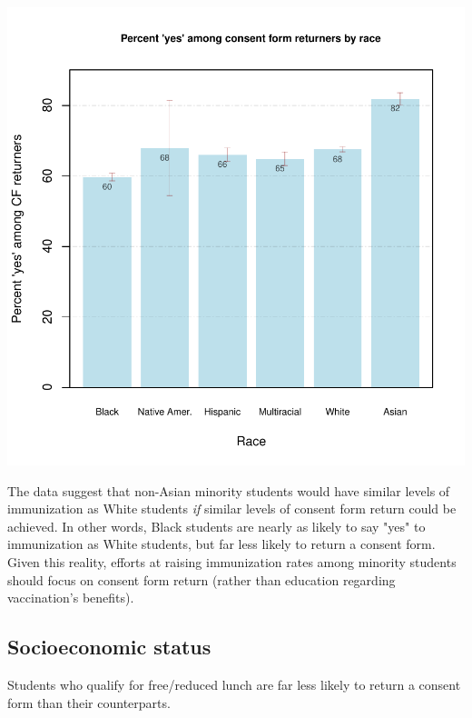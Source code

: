 \documentclass{article}
\begin{document}
\begin{multicols}{2}
\begin{multicols}{2}
\begin{center}
\includegraphics{superintendent-005}
\end{center}

The data suggest that non-Asian minority students would have similar levels of immunization as White students \emph{if} similar levels of consent form return could be achieved.  In other words, Black students are nearly as likely to say "yes" to immunization as White students, but far less likely to return a consent form.   Given this reality, efforts at raising immunization rates among minority students should focus on consent form return (rather than education regarding vaccination's benefits). 

\vfill
\columnbreak

\subsection*{Socioeconomic status}
Students who qualify for free/reduced lunch are far less likely to return a consent form than their counterparts.



\end{multicols}
\end{multicols}
\end{document}

